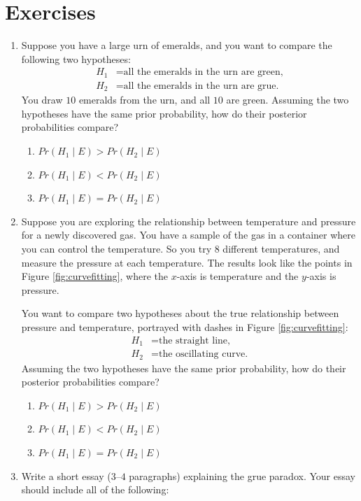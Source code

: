 \documentclass[justified]{tufte-book}
\providecommand{\tightlist}{%
  \setlength{\itemsep}{0pt}\setlength{\parskip}{0pt}}
\newcommand{\given}{\mid}
\newcommand{\p}{Pr}
\theoremstyle{definition}
\theoremstyle{definition}
\theoremstyle{definition}
\theoremstyle{definition}
\theoremstyle{remark}
\begin{document}
\hypertarget{exercises-19}{%
\section*{Exercises}\label{exercises-19}}

\begin{enumerate}
\def\labelenumi{\arabic{enumi}.}
\item
  Suppose you have a large urn of emeralds, and you want to compare the following two hypotheses:
  \begin{align*}
  H_1 &= \text{all the emeralds in the urn are green,}\\
  H_2 &= \text{all the emeralds in the urn are grue.}
  \end{align*}
  You draw \(10\) emeralds from the urn, and all \(10\) are green. Assuming the two hypotheses have the same prior probability, how do their posterior probabilities compare?

  \begin{enumerate}
  \def\labelenumii{\alph{enumii}.}
  \tightlist
  \item
    \(\p(H_1 \given E) > \p(H_2 \given E)\)
  \item
    \(\p(H_1 \given E) < \p(H_2 \given E)\)
  \item
    \(\p(H_1 \given E) = \p(H_2 \given E)\)
  \end{enumerate}
\item
  Suppose you are exploring the relationship between temperature and pressure for a newly discovered gas. You have a sample of the gas in a container where you can control the temperature. So you try \(8\) different temperatures, and measure the pressure at each temperature. The results look like the points in Figure \ref{fig:curvefitting}, where the \(x\)-axis is temperature and the \(y\)-axis is pressure.

  You want to compare two hypotheses about the true relationship between pressure and temperature, portrayed with dashes in Figure \ref{fig:curvefitting}:
  \begin{align*}
  H_1 &= \text{the straight line,}\\
  H_2 &= \text{the oscillating curve.}
  \end{align*}
  Assuming the two hypotheses have the same prior probability, how do their posterior probabilities compare?

  \begin{enumerate}
  \def\labelenumii{\alph{enumii}.}
  \tightlist
  \item
    \(\p(H_1 \given E) > \p(H_2 \given E)\)
  \item
    \(\p(H_1 \given E) < \p(H_2 \given E)\)
  \item
    \(\p(H_1 \given E) = \p(H_2 \given E)\)
  \end{enumerate}
\item
  Write a short essay (\(3\)--\(4\) paragraphs) explaining the grue paradox. Your essay should include all of the following:


\end{enumerate}
\end{document}
